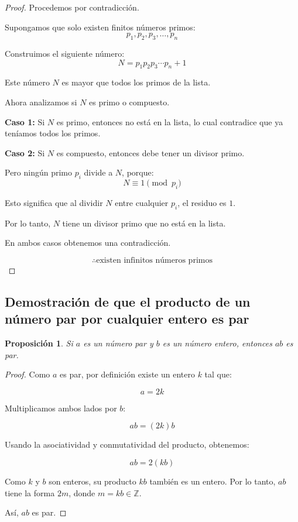\documentclass[12pt,final]{report}
\theoremstyle{plain}
\newtheorem{proposition}[theorem]{Proposición}
\theoremstyle{definition}
\begin{document}
\begin{proof}

Procedemos por contradicción.

Supongamos que solo existen finitos números primos:
\[
p_1, p_2, p_3, \dots, p_n
\]

Construimos el siguiente número:
\[
N = p_1 p_2 p_3 \cdots p_n + 1
\]

Este número $N$ es mayor que todos los primos de la lista.

Ahora analizamos si $N$ es primo o compuesto.

\textbf{Caso 1:} Si $N$ es primo, entonces no está en la lista, lo cual contradice que ya teníamos todos los primos.

\textbf{Caso 2:} Si $N$ es compuesto, entonces debe tener un divisor primo.

Pero ningún primo $p_i$ divide a $N$, porque:
\[
N \equiv 1 \pmod{p_i}
\]

Esto significa que al dividir $N$ entre cualquier $p_i$, el residuo es $1$.

Por lo tanto, $N$ tiene un divisor primo que no está en la lista.

En ambos casos obtenemos una contradicción.

\[
\therefore \text{existen infinitos números primos}
\]

\end{proof}

\newpage


\subsection{Demostración de que el producto de un número par por cualquier entero es par}

\begin{proposition}
Si $a$ es un número par y $b$ es un número entero, entonces $ab$ es par.
\end{proposition}

\begin{proof}

Como $a$ es par, por definición existe un entero $k$ tal que:

\[
a = 2k
\]

Multiplicamos ambos lados por $b$:

\[
ab = (2k)b
\]

Usando la asociatividad y conmutatividad del producto, obtenemos:

\[
ab = 2(kb)
\]

Como $k$ y $b$ son enteros, su producto $kb$ también es un entero. Por lo tanto, $ab$ tiene la forma $2m$, donde $m = kb \in \mathbb{Z}$.

Así, $ab$ es par.

\end{proof}
\end{document}
